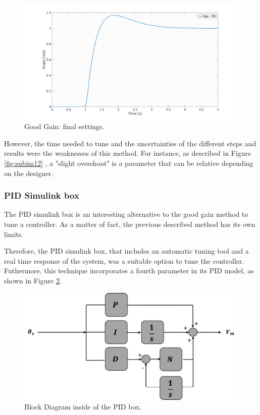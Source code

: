 \begin{figure}[H]
  \centerline{
  \includegraphics[scale=0.35]{figures/GG5.png}}
  \caption[LABEL] {Good Gain: final settings.}
  \label{finalGG}
\end{figure}

However, the time needed to tune and the uncertainties of the different steps and results were the weaknesses of this method. For instance, as described in Figure \ref{fig:subim12} , a "slight overshoot" is a parameter that can be relative depending on the designer.\par  
  
\subsubsection{PID Simulink box}
The PID simulink box is an interesting alternative to the good gain method to tune a controller. As a matter of fact, the previous described method has its own limits.\par 
  
Therefore, the PID simulink box, that includes an automatic tuning tool and a real time response of the system, was a suitable option to tune the controller. Futhermore, this technique incorporates a fourth parameter in its PID model, as shown in Figure \ref{PID_box_N}. 
 
\begin{figure}[H]
\centering
\includegraphics[scale=0.6]{figures/controller_box.png}
\caption{Block Diagram inside of the PID box.}
\label{PID_box_N}
\end{figure}

